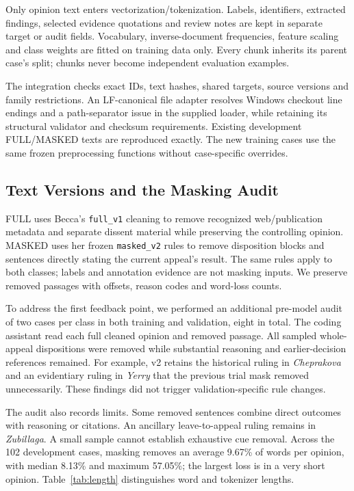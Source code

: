 \documentclass[conference]{IEEEtran}
\begin{document}
Only opinion text enters vectorization/tokenization. Labels, identifiers, extracted findings, selected evidence quotations and review notes are kept in separate target or audit fields. Vocabulary, inverse-document frequencies, feature scaling and class weights are fitted on training data only. Every chunk inherits its parent case's split; chunks never become independent evaluation examples.

The integration checks exact IDs, text hashes, shared targets, source versions and family restrictions. An LF-canonical file adapter resolves Windows checkout line endings and a path-separator issue in the supplied loader, while retaining its structural validator and checksum requirements. Existing development FULL/MASKED texts are reproduced exactly. The new training cases use the same frozen preprocessing functions without case-specific overrides.

\subsection{Text Versions and the Masking Audit}
FULL uses Becca's \texttt{full\_v1} cleaning to remove recognized web/publication metadata and separate dissent material while preserving the controlling opinion. MASKED uses her frozen \texttt{masked\_v2} rules to remove disposition blocks and sentences directly stating the current appeal's result. The same rules apply to both classes; labels and annotation evidence are not masking inputs. We preserve removed passages with offsets, reason codes and word-loss counts.

To address the first feedback point, we performed an additional pre-model audit of two cases per class in both training and validation, eight in total. The coding assistant read each full cleaned opinion and removed passage. All sampled whole-appeal dispositions were removed while substantial reasoning and earlier-decision references remained. For example, v2 retains the historical ruling in \emph{Cheprakova} and an evidentiary ruling in \emph{Yerry} that the previous trial mask removed unnecessarily. These findings did not trigger validation-specific rule changes.

The audit also records limits. Some removed sentences combine direct outcomes with reasoning or citations. An ancillary leave-to-appeal ruling remains in \emph{Zubillaga}. A small sample cannot establish exhaustive cue removal. Across the 102 development cases, masking removes an average 9.67\% of words per opinion, with median 8.13\% and maximum 57.05\%; the largest loss is in a very short opinion. Table~\ref{tab:length} distinguishes word and tokenizer lengths.

\end{document}
